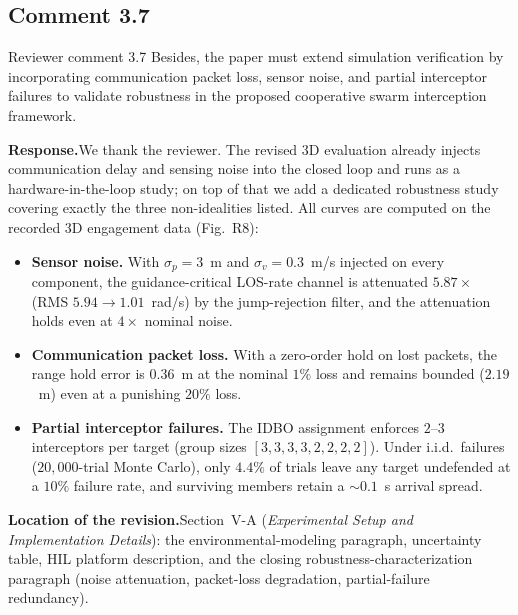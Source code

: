 \documentclass[11pt]{article}
\newcommand{\rsp}{\medskip\noindent\textbf{Response.}\quad}
\newcommand{\loc}{\medskip\noindent\textbf{Location of the revision.}\quad}
\begin{document}

\subsection*{Comment 3.7 }

\begin{reviewercomment}{Reviewer comment 3.7}
Besides, the paper must extend simulation verification by incorporating communication
packet loss, sensor noise, and partial interceptor failures to validate robustness in
the proposed cooperative swarm interception framework.
\end{reviewercomment}

\rsp We thank the reviewer. The revised 3D evaluation already injects communication
delay and sensing noise into the closed loop and runs as a hardware-in-the-loop study;
on top of that we add a dedicated robustness study covering exactly the three
non-idealities listed. All curves are computed on the recorded 3D engagement data
(Fig.~R8):
\begin{itemize}
  \item \textbf{Sensor noise.} With $\sigma_p=3$~m and $\sigma_v=0.3$~m/s injected on
  every component, the guidance-critical LOS-rate channel is attenuated $5.87\times$
  (RMS $5.94\!\rightarrow\!1.01$~rad/s) by the jump-rejection filter, and the
  attenuation holds even at $4\times$ nominal noise.
  \item \textbf{Communication packet loss.} With a zero-order hold on lost packets, the
  range hold error is $0.36$~m at the nominal $1\%$ loss and remains bounded
  ($2.19$~m) even at a punishing $20\%$ loss.
  \item \textbf{Partial interceptor failures.} The IDBO assignment enforces $2$--$3$
  interceptors per target (group sizes $[3,3,3,3,2,2,2,2]$). Under i.i.d.\ failures
  ($20{,}000$-trial Monte Carlo), only $4.4\%$ of trials leave any target undefended at
  a $10\%$ failure rate, and surviving members retain a $\sim0.1$~s arrival spread.
\end{itemize}

\loc Section~V-A (\emph{Experimental Setup and Implementation Details}): the
environmental-modeling paragraph, uncertainty table, HIL platform description, and
the closing robustness-characterization paragraph (noise attenuation, packet-loss
degradation, partial-failure redundancy).
\end{document}
